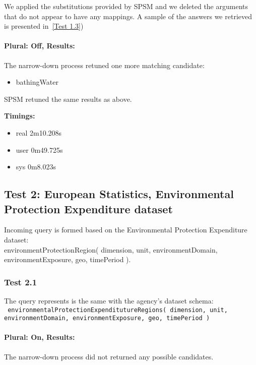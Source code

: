 \documentclass[a4paper,10pt]{article}
\begin{document}
 
We applied the substitutions provided by SPSM and we deleted the arguments that do not appear to have any mappings.  
A sample of the answers we retrieved is presented in~\ref{Test 1.3})
\paragraph{Plural: Off, Results: } The narrow-down process retuned one more matching candidate: 
\begin{itemize}
\item bathingWater
\end{itemize}
SPSM retuned the same results as above.

 
\textbf{Timings:} 
\begin{itemize}
\item real	2m10.208s
\item user	0m49.725s
\item sys	0m8.023s
\end{itemize}


\subsection{Test 2: European Statistics, Environmental Protection Expenditure dataset}



Incoming query is formed based on the  Environmental Protection Expenditure dataset:\\
\indent environmentProtectionRegion( dimension, unit, environmentDomain,  environmentExposure, geo, timePeriod ).
	
	
\subsubsection{Test 2.1} The query represents is the same with the agency's dataset schema:\\	
\indent \texttt{ environmentalProtectionExpenditutureRegions( dimension, unit,  environmentDomain, environmentExposure, geo, timePeriod )}
	
\paragraph{Plural: On, Results: } The narrow-down process did not returned any possible candidates. 
	
\end{document}
